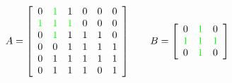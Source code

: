 \documentclass[varwidth=true]{standalone}
\newcommand{\tikzmark}[2]{\tikz[overlay,remember picture,baseline=(#1.base)] \node (#1) {#2};}
\begin{document}
\[
	A = \left[\begin{array}{*6{c}}
    0 & \color{green}{1} & 1 & 0 & 0 & 0 \\
    \color{green}{1} & \color{green}{1} & \color{green}{1} & 0 & 0 & 0 \\
    0 & \color{green}{1} & 1 & 1 & 1 & 0 \\
    0 & 0 & 1 & 1 & 1 & 1 \\
    0 & 1 & 1 & 1 & 1 & 1  \\
    0 & 1 & 1 & 1 & 0 & 1 
  \end{array}\right]
  \qquad
  B  = \left[\begin{array}{*3{c}}
    \tikzmark{left}{0} & \color{green}{1} & 0\\
    \color{green}{1} & \color{green}{1} & \color{green}{1} \\
    0 & \color{green}{1} & \tikzmark{right}{0}
  \end{array}\right]
\]

\end{document}
